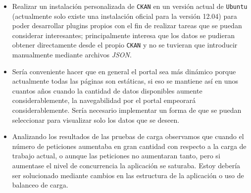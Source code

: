 \begin{itemize}
	\item Realizar un instalación personalizada de {\tt CKAN} en un versión actual de {\tt Ubuntu} (actualmente solo existe una instalación oficial para la versión 12.04) para poder desarrollar
	plugins propios con el fin de realizar tareas que se puedan considerar interesantes; principalmente interesa que los datos se pudieran obtener directamente desde el propio {\tt CKAN} y no se tuvieran que introducir manualmente mediante archivos \textit{JSON}.
	\item Sería conveniente hacer que en general el portal sea más dinámico porque actualmente todas las páginas son estáticas, si eso se mantiene así en unos cuantos años cuando la cantidad de datos disponibles aumente considerablemente, la navegabilidad por el portal empeorará considerablemente. Sería necesario implementar un forma de que se puedan seleccionar para visualizar solo los datos que se deseen.
	\item Analizando los resultados de las pruebas de carga observamos que cuando el número de peticiones aumentaba en gran cantidad con respecto a la carga de trabajo actual, o aunque las peticiones no aumentaran tanto, pero si aumentase el nivel de concurrencia la aplicación se saturaba. Estoy debería ser solucionado mediante cambios en las estructura de la aplicación o uso de balanceo de carga.
\end{itemize}